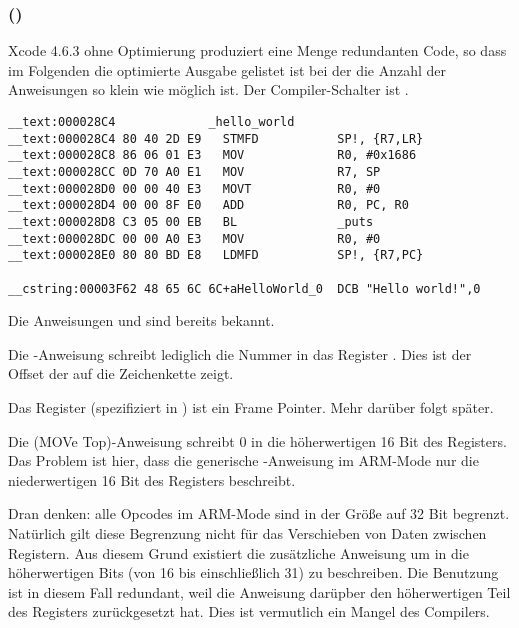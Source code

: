\subsubsection{\OptimizingXcodeIV (\ARMMode)}

Xcode 4.6.3 ohne Optimierung produziert eine Menge redundanten Code, so dass im Folgenden die
optimierte Ausgabe gelistet ist bei der die Anzahl der Anweisungen so klein wie möglich ist.
Der Compiler-Schalter ist \Othree.

\begin{lstlisting}[caption=\OptimizingXcodeIV (\ARMMode)]
__text:000028C4             _hello_world
__text:000028C4 80 40 2D E9   STMFD           SP!, {R7,LR}
__text:000028C8 86 06 01 E3   MOV             R0, #0x1686
__text:000028CC 0D 70 A0 E1   MOV             R7, SP
__text:000028D0 00 00 40 E3   MOVT            R0, #0
__text:000028D4 00 00 8F E0   ADD             R0, PC, R0
__text:000028D8 C3 05 00 EB   BL              _puts
__text:000028DC 00 00 A0 E3   MOV             R0, #0
__text:000028E0 80 80 BD E8   LDMFD           SP!, {R7,PC}

__cstring:00003F62 48 65 6C 6C+aHelloWorld_0  DCB "Hello world!",0
\end{lstlisting}

Die Anweisungen  und  sind bereits bekannt.


Die \MOV-Anweisung schreibt lediglich die Nummer  in das Register .
Dies ist der Offset der auf die Zeichenkette  zeigt.

Das Register  (spezifiziert in \IOSABI) ist ein Frame Pointer. Mehr darüber folgt später.

Die  (MOVe Top)-Anweisung schreibt 0 in die höherwertigen 16 Bit des Registers.
Das Problem ist hier, dass die generische \MOV-Anweisung im ARM-Mode nur die niederwertigen 16 Bit
des Registers beschreibt.

Dran denken: alle Opcodes im ARM-Mode sind in der Größe auf 32 Bit begrenzt. Natürlich gilt diese
Begrenzung nicht für das Verschieben von Daten zwischen Registern.
Aus diesem Grund existiert die zusätzliche Anweisung   um in die höherwertigen Bits
(von 16 bis einschließlich 31) zu beschreiben.
Die Benutzung ist in diesem Fall redundant, weil die Anweisung  darüpber
den höherwertigen Teil des Registers zurückgesetzt hat.
Dies ist vermutlich ein Mangel des Compilers.

